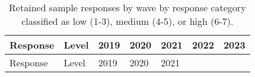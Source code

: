 \documentclass[
  single column]{article}
\begin{document}
\begin{longtable}[]{@{}
  >{\raggedright\arraybackslash}p{}
  >{\raggedright\arraybackslash}p{}
  >{\raggedright\arraybackslash}p{}
  >{\raggedright\arraybackslash}p{}
  >{\raggedright\arraybackslash}p{}
  >{\raggedright\arraybackslash}p{}
  >{\raggedright\arraybackslash}p{}@{}}
\caption{Retained sample responses by wave by response category
classified as low (1-3), medium (4-5), or high
(6-7).}\label{tbl-sample-cat}\tabularnewline
\toprule\noalign{}
\begin{minipage}[b]{\linewidth}\raggedright
Response
\end{minipage} & \begin{minipage}[b]{\linewidth}\raggedright
Level
\end{minipage} & \begin{minipage}[b]{\linewidth}\raggedright
2019
\end{minipage} & \begin{minipage}[b]{\linewidth}\raggedright
2020
\end{minipage} & \begin{minipage}[b]{\linewidth}\raggedright
2021
\end{minipage} & \begin{minipage}[b]{\linewidth}\raggedright
2022
\end{minipage} & \begin{minipage}[b]{\linewidth}\raggedright
2023
\end{minipage} \\
\midrule\noalign{}
\endfirsthead
\toprule\noalign{}
\begin{minipage}[b]{\linewidth}\raggedright
Response
\end{minipage} & \begin{minipage}[b]{\linewidth}\raggedright
Level
\end{minipage} & \begin{minipage}[b]{\linewidth}\raggedright
2019
\end{minipage} & \begin{minipage}[b]{\linewidth}\raggedright
2020
\end{minipage} & \begin{minipage}[b]{\linewidth}\raggedright
2021
\end{minipage} & \begin{minipage}[b]{\linewidth}\raggedright

\end{minipage}
\end{longtable}
\end{document}
